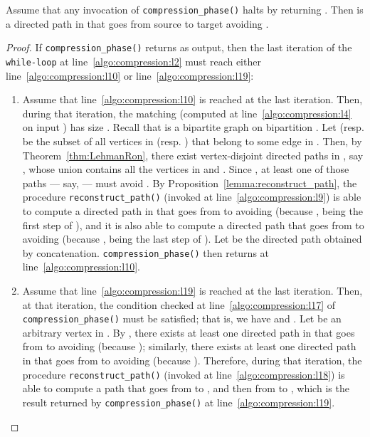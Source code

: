 \begin{lemma}\label{lemma:compression_path}
Assume that any invocation of \texttt{compression\_phase()} halts by returning .
Then  is a directed path in  that goes from source  to target  avoiding .
\end{lemma}
\begin{proof}
If \texttt{compression\_phase()} returns  as output, then the last iteration of the
\texttt{while-loop} at line~\ref{algo:compression:l2} must reach
either line~\ref{algo:compression:l10} or line~\ref{algo:compression:l19}:
\begin{enumerate}
\item
Assume that line~\ref{algo:compression:l10} is reached at the last iteration.
Then, during that iteration, the matching  (computed at line~\ref{algo:compression:l4} on input ) has size .
Recall that  is a bipartite graph on bipartition .
Let  (resp.  be the subset of all vertices in  (resp. ) that
belong
to some edge in . Then, by Theorem~\ref{thm:LehmanRon}, there exist  vertex-disjoint directed paths in , say
, whose union contains all the vertices in  and .
Since , at least one of those paths --- say,  --- must avoid .
By Proposition~\ref{lemma:reconstruct_path}, the procedure
\texttt{reconstruct\_path()} (invoked at line~\ref{algo:compression:l9}) is
able
to compute a directed path  in  that goes from  to  avoiding 
(because , being the first step of ), and it is also
able
to compute a directed path 
that goes from  to  avoiding  (because , being the last step of ).
Let  be the directed path obtained by concatenation.
\texttt{compression\_phase()} then returns  at line~\ref{algo:compression:l10}.
\item
Assume that line~\ref{algo:compression:l19} is reached at the last iteration.
Then, at that iteration, the condition checked at line~\ref{algo:compression:l17} of \texttt{compression\_phase()} must be satisfied;
that is, we have  and .
Let  be an arbitrary vertex in .
By , there exists at least one directed path  in 
that goes from  to  avoiding  (because );
similarly, there exists at least one directed path  in  that goes from  to  avoiding  (because ).
Therefore, during that iteration, the procedure \texttt{reconstruct\_path()}
(invoked at line~\ref{algo:compression:l18}) is
able
to compute a path  that goes from  to , and then from  to , which is the result
returned by \texttt{compression\_phase()} at line~\ref{algo:compression:l19}.
\end{enumerate}
\end{proof}

